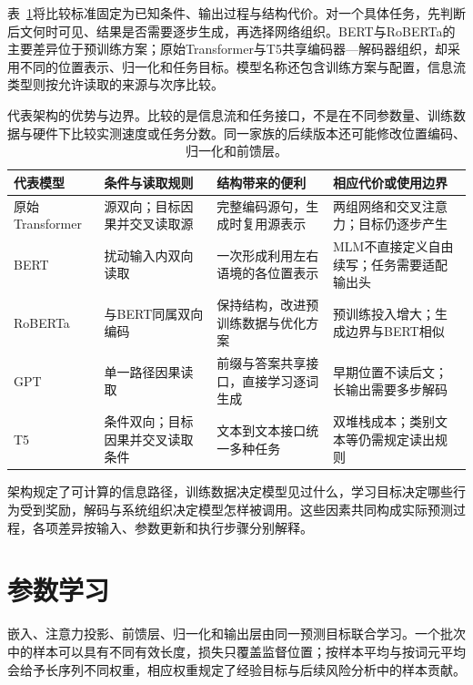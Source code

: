 表~\ref{tab:transformer-common-architectures}将比较标准固定为已知条件、输出过程与结构代价。对一个具体任务，先判断后文何时可见、结果是否需要逐步生成，再选择网络组织。BERT与RoBERTa的主要差异位于预训练方案；原始Transformer与T5共享编码器—解码器组织，却采用不同的位置表示、归一化和任务目标。模型名称还包含训练方案与配置，信息流类型则按允许读取的来源与次序比较。

\begin{table}[htbp]
  \centering
  \small
  \begin{tabular}{@{}p{24mm}p{34mm}p{47mm}p{50mm}@{}}
    \toprule
    代表模型 & 条件与读取规则 & 结构带来的便利 & 相应代价或使用边界 \\
    \midrule
    原始Transformer & 源双向；目标因果并交叉读取源 & 完整编码源句，生成时复用源表示 & 两组网络和交叉注意力；目标仍逐步产生 \\
    BERT & 扰动输入内双向读取 & 一次形成利用左右语境的各位置表示 & MLM不直接定义自由续写；任务需要适配输出头 \\
    RoBERTa & 与BERT同属双向编码 & 保持结构，改进预训练数据与优化方案 & 预训练投入增大；生成边界与BERT相似 \\
    GPT & 单一路径因果读取 & 前缀与答案共享接口，直接学习逐词生成 & 早期位置不读后文；长输出需要多步解码 \\
    T5 & 条件双向；目标因果并交叉读取条件 & 文本到文本接口统一多种任务 & 双堆栈成本；类别文本等仍需规定读出规则 \\
    \bottomrule
  \end{tabular}
  \caption{代表架构的优势与边界。比较的是信息流和任务接口，不是在不同参数量、训练数据与硬件下比较实测速度或任务分数。同一家族的后续版本还可能修改位置编码、归一化和前馈层。}
  \label{tab:transformer-common-architectures}
\end{table}

架构规定了可计算的信息路径，训练数据决定模型见过什么，学习目标决定哪些行为受到奖励，解码与系统组织决定模型怎样被调用。这些因素共同构成实际预测过程，各项差异按输入、参数更新和执行步骤分别解释。


\FloatBarrier
\section{参数学习}
\label{sec:transformer-learning}

嵌入、注意力投影、前馈层、归一化和输出层由同一预测目标联合学习。一个批次中的样本可以具有不同有效长度，损失只覆盖监督位置；按样本平均与按词元平均会给予长序列不同权重，相应权重规定了经验目标与后续风险分析中的样本贡献。

